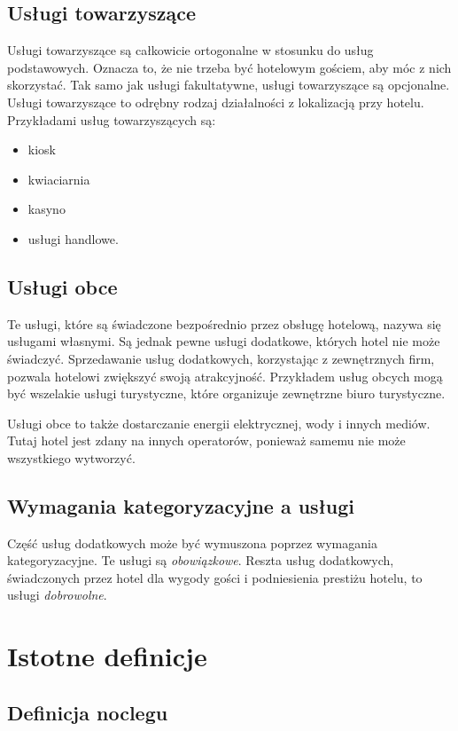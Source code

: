 \documentclass[a4paper,onecolumn,oneside,11pt,wide,floatssmall]{mwrep}
\theoremstyle{definition}
\theoremstyle{plain}%
\theoremstyle{remark}
\begin{document}
\subsection{Usługi towarzyszące}
Usługi towarzyszące są całkowicie ortogonalne w stosunku do usług 
podstawowych. Oznacza to, że nie trzeba być hotelowym gościem, aby móc z 
nich skorzystać. Tak samo jak usługi fakultatywne, usługi towarzyszące są 
opcjonalne. Usługi towarzyszące to odrębny rodzaj działalności z lokalizacją 
przy hotelu. Przykładami usług towarzyszących są:

\begin{itemize}
  \item kiosk
  \item kwiaciarnia
  \item kasyno
  \item usługi handlowe.
\end{itemize}

\subsection{Usługi obce}
Te usługi, które są świadczone bezpośrednio przez obsługę hotelową, nazywa 
się usługami własnymi. Są jednak pewne usługi dodatkowe, których hotel nie 
może świadczyć. Sprzedawanie usług dodatkowych, 
korzystając z zewnętrznych firm, pozwala hotelowi zwiększyć swoją \mbox{atrakcyjność.} Przykładem usług obcych mogą być wszelakie usługi turystyczne, 
które organizuje zewnętrzne biuro turystyczne.

Usługi obce to także dostarczanie energii elektrycznej, wody i innych mediów.
 Tutaj hotel jest zdany na innych operatorów, ponieważ samemu nie może wszystkiego 
wytworzyć.

\subsection{Wymagania kategoryzacyjne a usługi}
Część usług dodatkowych może być wymuszona poprzez wymagania kategoryzacyjne.
 Te usługi są \emph{obowiązkowe}. Reszta usług dodatkowych, świadczonych 
 przez hotel dla wygody gości i podniesienia prestiżu 
 hotelu, to usługi \emph{dobrowolne}.

\section{Istotne definicje}
\subsection{Definicja noclegu}
\end{document}
